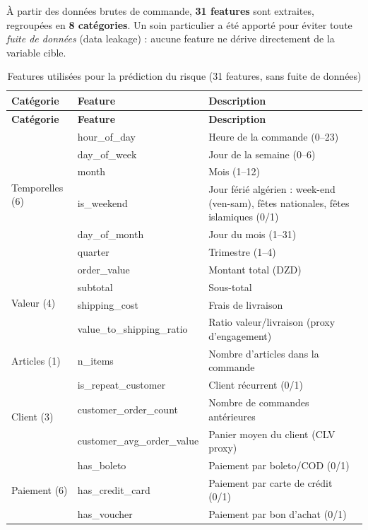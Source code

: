\documentclass[12pt,a4paper]{report}
\begin{document}
\`{A} partir des donn\'{e}es brutes de commande, \textbf{31 features} sont extraites, regroup\'{e}es en \textbf{8 cat\'{e}gories}. Un soin particulier a \'{e}t\'{e} apport\'{e} pour \'{e}viter toute \textit{fuite de donn\'{e}es} (data leakage) : aucune feature ne d\'{e}rive directement de la variable cible.

\begin{longtable}{l l p{7cm}}
\caption{Features utilis\'{e}es pour la pr\'{e}diction du risque (31 features, sans fuite de donn\'{e}es)} \label{tab:features} \\
\toprule
\textbf{Cat\'{e}gorie} & \textbf{Feature} & \textbf{Description} \\
\midrule
\endfirsthead
\toprule
\textbf{Cat\'{e}gorie} & \textbf{Feature} & \textbf{Description} \\
\midrule
\endhead
\multirow{6}{*}{Temporelles (6)} & hour\_of\_day & Heure de la commande (0--23) \\
 & day\_of\_week & Jour de la semaine (0--6) \\
 & month & Mois (1--12) \\
 & is\_weekend & Jour f\'{e}ri\'{e} alg\'{e}rien : week-end (ven-sam), f\^{e}tes nationales, f\^{e}tes islamiques (0/1) \\
 & day\_of\_month & Jour du mois (1--31) \\
 & quarter & Trimestre (1--4) \\
\midrule
\multirow{4}{*}{Valeur (4)} & order\_value & Montant total (DZD) \\
 & subtotal & Sous-total \\
 & shipping\_cost & Frais de livraison \\
 & value\_to\_shipping\_ratio & Ratio valeur/livraison (proxy d'engagement) \\
\midrule
Articles (1) & n\_items & Nombre d'articles dans la commande \\
\midrule
\multirow{3}{*}{Client (3)} & is\_repeat\_customer & Client r\'{e}current (0/1) \\
 & customer\_order\_count & Nombre de commandes ant\'{e}rieures \\
 & customer\_avg\_order\_value & Panier moyen du client (CLV proxy) \\
\midrule
\multirow{6}{*}{Paiement (6)} & has\_boleto & Paiement par boleto/COD (0/1) \\
 & has\_credit\_card & Paiement par carte de cr\'{e}dit (0/1) \\
 & has\_voucher & Paiement par bon d'achat (0/1) \\

\end{longtable}
\end{document}
